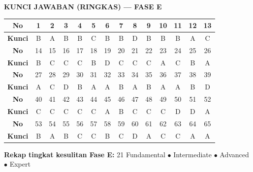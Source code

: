 \documentclass[11pt,a4paper]{exam}
\begin{document}
\clearpage
{\large\bfseries\color{biru} KUNCI JAWABAN (RINGKAS) — FASE E}\par
\vspace{8pt}
\renewcommand{\arraystretch}{1.3}
\begin{center}
\begin{tabular}{|c|*{13}{c|}}
\hline
\cellcolor{biru!15}\textbf{No}  & 1 & 2 & 3 & 4 & 5 & 6 & 7 & 8 & 9 & 10 & 11 & 12 & 13\\\hline
\cellcolor{biru!15}\textbf{Kunci} & B & A & B & B & C & B & B & D & B & B & B & A & C\\\hline\hline
\cellcolor{biru!15}\textbf{No}  & 14 & 15 & 16 & 17 & 18 & 19 & 20 & 21 & 22 & 23 & 24 & 25 & 26\\\hline
\cellcolor{biru!15}\textbf{Kunci} & B & C & C & C & B & D & C & C & C & A & C & B & A\\\hline\hline
\cellcolor{biru!15}\textbf{No}  & 27 & 28 & 29 & 30 & 31 & 32 & 33 & 34 & 35 & 36 & 37 & 38 & 39\\\hline
\cellcolor{biru!15}\textbf{Kunci} & A & C & D & B & A & A & B & A & B & A & A & B & D\\\hline\hline
\cellcolor{biru!15}\textbf{No}  & 40 & 41 & 42 & 43 & 44 & 45 & 46 & 47 & 48 & 49 & 50 & 51 & 52\\\hline
\cellcolor{biru!15}\textbf{Kunci} & C & C & C & C & C & A & B & C & C & C & D & D & A\\\hline\hline
\cellcolor{biru!15}\textbf{No}  & 53 & 54 & 55 & 56 & 57 & 58 & 59 & 60 & 61 & 62 & 63 & 64 & 65\\\hline
\cellcolor{biru!15}\textbf{Kunci} & B & A & B & C & C & B & C & D & A & C & C & A & A\\\hline
\end{tabular}
\end{center}

\vspace{8pt}
\begin{center}\small
\textbf{Rekap tingkat kesulitan Fase E:}
21 Fundamental \;$\bullet$ Intermediate \;$\bullet$ Advanced \;$\bullet$ Expert
\end{center}
\end{document}
